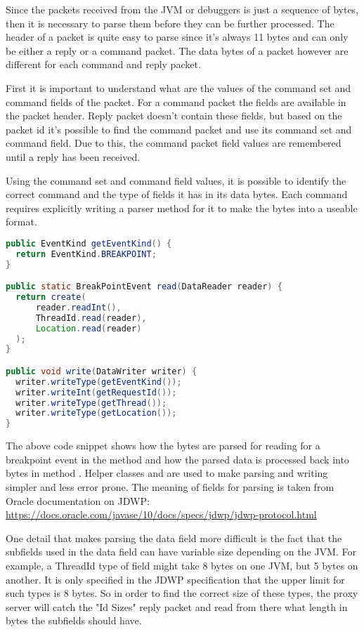 \documentclass[..thesis.tex]{subfiles}
\begin{document}
Since the packets received from the JVM or debuggers is just a sequence of bytes, then it is necessary to parse them before they can be further processed.
The header of a packet is quite easy to parse since it's always 11 bytes and can only be either a reply or a command packet.
The data bytes of a packet however are different for each command and reply packet.

First it is important to understand what are the values of the command set and command fields of the packet. 
For a command packet the fields are available in the packet header.
Reply packet doesn't contain these fields, but based on the packet id it's possible to find the command packet and use its command set and command field.
Due to this, the command packet field values are remembered until a reply has been received. 

Using the command set and command field values, it is possible to identify the correct command and the type of fields it has in its data bytes.
Each command requires explicitly writing a parser method for it to make the bytes into a useable format.

\begin{lstlisting}[language=java]
public EventKind getEventKind() {
  return EventKind.BREAKPOINT;
}

public static BreakPointEvent read(DataReader reader) {
  return create(
      reader.readInt(),
      ThreadId.read(reader),
      Location.read(reader)
  );
}

public void write(DataWriter writer) {
  writer.writeType(getEventKind());
  writer.writeInt(getRequestId());
  writer.writeType(getThread());
  writer.writeType(getLocation());
}
\end{lstlisting}

The above code snippet shows how the bytes are parsed for reading for a breakpoint event in the method  and how the parsed data is processed back into bytes in method .
Helper classes  and  are used to make parsing and writing simpler and less error prone.
The meaning of fields for parsing is taken from Oracle documentation on JDWP: \url{https://docs.oracle.com/javase/10/docs/specs/jdwp/jdwp-protocol.html} 

One detail that makes parsing the data field more difficult is the fact that the subfields used in the data field can have variable size depending on the JVM.
For example, a ThreadId type of field might take 8 bytes on one JVM, but 5 bytes on another.
It is only specified in the JDWP specification that the upper limit for such types is 8 bytes.
So in order to find the correct size of these types, the proxy server will catch the "Id Sizes" reply packet and read from there what length in bytes the subfields should have.
\end{document}

